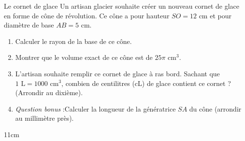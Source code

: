 \documentclass[a4paper]{book}
\begin{document}
    \begin{exerciceTitre}{Le cornet de glace}
    Un artisan glacier souhaite créer un nouveau cornet de glace en forme de cône de révolution. 
    Ce cône a pour hauteur $SO = 12 \text{ cm}$ et pour diamètre de base $AB = 5 \text{ cm}$.
    
    \begin{enumerate}
        \item Calculer le rayon de la base de ce cône.
        \item Montrer que le volume exact de ce cône est de $25\pi \text{ cm}^3$.
        \item L'artisan souhaite remplir ce cornet de glace à ras bord. Sachant que $1 \text{ L} = 1000 \text{ cm}^3$, combien de centilitres (cL) de glace contient ce cornet ? (Arrondir au dixième).
        \item \textit{Question bonus} :Calculer la longueur de la génératrice $SA$ du cône (arrondir au millimètre près).
    \end{enumerate}
    \end{exerciceTitre}
    
    \begin{ZoneReponse}{11cm}
    \end{ZoneReponse}
\end{document}
